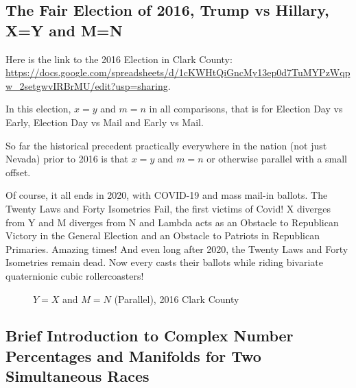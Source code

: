\documentclass[preprint,13pt]{elsarticle}
\begin{document}
\subsection{The Fair Election of 2016, Trump vs Hillary, X=Y and M=N}

Here is the link to the 2016 Election in Clark County: \url{https://docs.google.com/spreadsheets/d/1cKWHtQiGncMy13ep0d7TuMYPzWqpw_2setgwvIRBrMU/edit?usp=sharing}.

In this election, $x=y$ and $m=n$ in all comparisons, that is for Election Day vs Early, Election Day vs Mail and Early vs Mail.

So far the historical precedent practically everywhere in the nation (not just Nevada) prior to 2016 is that $x=y$ and $m=n$ or otherwise parallel with a small offset.

Of course, it all ends in 2020, with COVID-19 and mass mail-in ballots. The Twenty Laws and Forty Isometries Fail, the first victims of Covid! X diverges from Y and M diverges from N and Lambda acts as an Obstacle to Republican Victory in the General Election and an Obstacle to Patriots in Republican Primaries. Amazing times! And even long after 2020, the Twenty Laws and Forty Isometries remain dead. Now every casts their ballots while riding bivariate quaternionic cubic rollercoasters!
\begin{figure}[bp!]
\begin{center}
\caption{$Y=X$ and $M=N$ (Parallel), 2016 Clark County}
\noindent{}
\end{center}
\end{figure}
\newpage
\subsection{Brief Introduction to Complex Number Percentages and Manifolds for Two Simultaneous Races}
\end{document}
